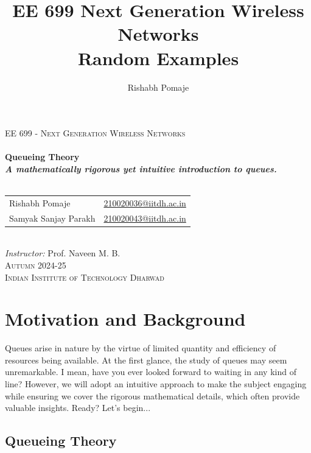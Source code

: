 \documentclass[11pt, a4paper]{report}
\title{\Huge{EE 699 Next Generation Wireless Networks}\\ Random Examples}
\author{\huge{Rishabh Pomaje}}
\date{}
\begin{document}
\vspace*{\fill}
\begin{center}
    \textsc{\LARGE EE 699 - Next Generation Wireless Networks}\\[0.6cm]
    \noindent\makebox[\linewidth]{\rule{0.7\paperwidth}{0.6pt}}\\[0.8cm]

    { \Huge \bfseries Queueing Theory \\[0.4cm] \Large \textit{A mathematically rigorous yet intuitive introduction to queues.}}\\[0.3cm]
    \noindent\makebox[\linewidth]{\rule{0.7\paperwidth}{0.6pt}}\\[0.8cm]

    \begin{tabular}{l l}
        \Large Rishabh Pomaje & \Large \href{mailto:210020036@iitdh.ac.in}{210020036@iitdh.ac.in} \\[0.5cm]
        \Large Samyak Sanjay Parakh & \Large \href{mailto:210020043@iitdh.ac.in}{210020043@iitdh.ac.in} \\[1.5cm]
    \end{tabular}\\
    \Large \textit{Instructor: }Prof. Naveen M. B.\\[5cm]

    \textsc{\Large Autumn 2024-25\\[0.3cm] Indian Institute of Technology Dharwad}
\end{center}
\vspace*{\fill}


\newpage%

\tableofcontents
\pagebreak

\chapter{Motivation and Background}
Queues arise in nature by the virtue of limited quantity and efficiency of resources being available. At the first glance, the study of queues may seem unremarkable. I mean, have you ever looked forward to waiting in any kind of line? However, we will adopt an intuitive approach to make the subject engaging while ensuring we cover the rigorous mathematical details, which often provide valuable insights. Ready? Let's begin...

\section{Queueing Theory}
\end{document}

